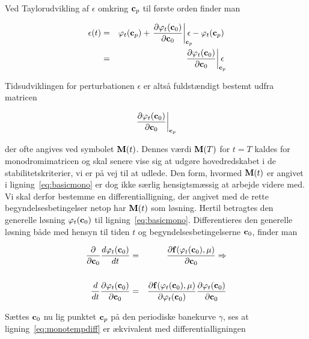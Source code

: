 Ved Taylorudvikling af $\epsilon$ omkring ${\bf c}_p$ til
f{\o}rste orden finder man

\begin{eqnarray}
 \epsilon(t) & = &
 \varphi_t({\bf c}_p) + 
 \left.
 \frac{\partial \varphi_t({\bf c}_0)}{\partial {\bf c}_0}
 \right|_{{\bf c}_p}\negsp\epsilon - 
 \varphi_t({\bf c}_p) \nonumber\\
 & = &
 \left.
 \frac{\partial \varphi_t({\bf c}_0)}{\partial {\bf c}_0}
 \right|_{{\bf c}_p}\negsp\epsilon
 \label{eq:basicmono}
\end{eqnarray}

Tidsudviklingen for perturbationen $\epsilon$ er alts{\aa} fuldst{\ae}ndigt
bestemt udfra matricen 

$$
 \left.\frac{\partial \varphi_t({\bf c}_0)}
 {\partial {\bf c}_0}\right|_{{\bf c}_p}
$$ 

der ofte angives ved symbolet ${\bf M}(t)$. Dennes
v{\ae}rdi ${\bf M}(T)$ for $t=T$ kaldes for
monodromimatricen og skal senere vise sig at udg{\o}re
hovedredskabet i de stabilitetskriterier, vi er p{\aa} vej
til at udlede. Den form, hvormed ${\bf M}(t)$ er angivet i
lig\-ning~\ref{eq:basicmono} er dog ikke s{\ae}rlig
hensigtsm{\ae}ssig at arbejde videre med. Vi skal derfor
bestemme en differentiallig\-ning, der angivet med de rette
begyndelsesbetingelser netop har ${\bf M}(t)$ som
l{\o}sning. Hertil betragtes den generelle l{\o}sning
$\varphi_t({\bf c}_0)$ til lig\-ning~\ref{eq:basicmono}.
Differentieres den generelle l{\o}sning b{\aa}de med hensyn
til tiden $t$ og begyndelsesbetingelserne ${\bf c}_0$,
finder man

\begin{eqnarray}
 \frac{\partial}{\partial {\bf c}_0}
 \frac{d \varphi_t({\bf c}_0)}{dt} & = &
 \frac{\partial {\bf f}(\varphi_t({\bf c}_0),\mu)}
      {\partial {\bf c}_0} \Rightarrow  \nonumber\\
 & &                                    \nonumber\\
 \frac{d}{dt}
 \frac{\partial\varphi_t({\bf c}_0)}{\partial{\bf c}_0} & = &
 \frac{\partial {\bf f}(\varphi_t({\bf c}_0),\mu)}
      {\partial \varphi_t({\bf c}_0)}
 \frac{\partial \varphi_t({\bf c}_0)} {\partial {\bf c}_0}
 \label{eq:monotempdiff}
\end{eqnarray}

S{\ae}ttes ${\bf c}_0$ nu lig punktet ${\bf c}_p$ p{\aa}
den periodiske banekurve $\gamma$, ses at
lig\-ning~\ref{eq:monotempdiff} er {\ae}kvivalent med
differentiallig\-ningen

